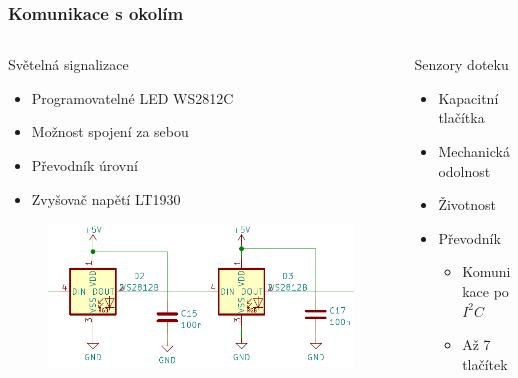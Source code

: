 \documentclass[%
  12pt,       				%
	t,                  %
	aspectratio=1610,   %
	unicode,						%
]{beamer}				    	%
\begin{document}
\begin{frame} 
	\frametitle{Komunikace s okolím}
	
	\begin{columns}[T] 								%
		\begin{column}{0.5\textwidth}		%
			Světelná signalizace
			\begin{itemize}
				\item Programovatelné LED WS2812C
				\item Možnost spojení za sebou
				\item Převodník úrovní
				\item Zvyšovač napětí LT1930
			\end{itemize}
			\begin{figure}%
				\centering	          
				\includegraphics[width=1\columnwidth]{obrazky/WS2812C_prezentace.png}
			\end{figure}
		\end{column}
		\begin{column}{0.5\textwidth}		%
			Senzory doteku
			\begin{itemize}
				\item Kapacitní tlačítka
				\item Mechanická odolnost
				\item Životnost
				\item Převodník
				\begin{itemize}
					\item Komunikace po  $I^2C$
					\item Až 7 tlačítek
				\end{itemize}
			\end{itemize}
			\begin{figure}%
				\centering
				\vspace{1cm}	              %
			\end{figure}
		\end{column}
	\end{columns}											%
\end{frame}
\end{document}
